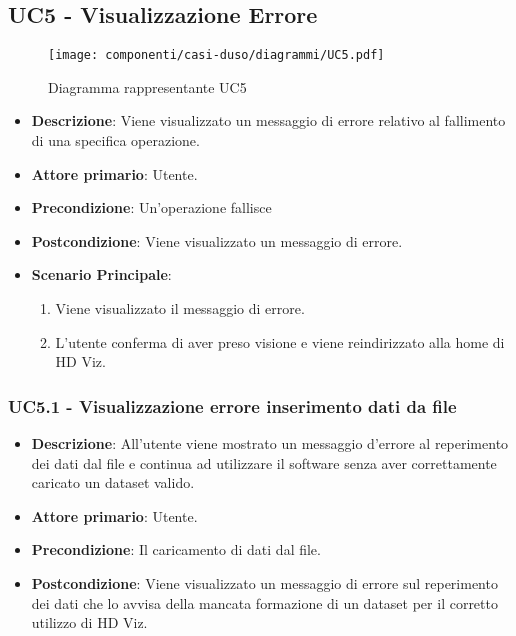 \newpage
\subsection{UC5 - Visualizzazione Errore}
\label{sub:uc5}

\begin{figure}[h]
    \centering
    \texttt{[image: componenti/casi-duso/diagrammi/UC5.pdf]}
    \caption{Diagramma rappresentante UC5}
    \label{fig:UC5}
\end{figure}

\begin{itemize}
    \item \textbf{Descrizione}: Viene visualizzato un messaggio di errore relativo al fallimento di una specifica operazione.

    \item \textbf{Attore primario}: Utente.
    
    \item \textbf{Precondizione}:   Un'operazione fallisce

    \item \textbf{Postcondizione}:  Viene visualizzato un messaggio di errore.
    
    \item \textbf{Scenario Principale}:
    \begin{enumerate}
        \item Viene visualizzato il messaggio di errore.
        \item L'utente conferma di aver preso visione e viene reindirizzato alla home di HD Viz.
    \end{enumerate}

\end{itemize}


\subsubsection{UC5.1 - Visualizzazione errore inserimento dati da file}
\label{ssub:uc5.1}
\begin{itemize}
    \item \textbf{Descrizione}: All'utente viene mostrato un messaggio d'errore al reperimento
                                dei dati dal file e continua ad utilizzare 
                                il software senza aver correttamente caricato un dataset valido.

    \item \textbf{Attore primario}: Utente.
    
    \item \textbf{Precondizione}:   Il caricamento di dati dal file.

    \item \textbf{Postcondizione}:  Viene visualizzato un messaggio di errore sul reperimento dei 
                                    dati che lo avvisa della mancata formazione di un dataset per il
                                    corretto utilizzo di HD Viz.

\end{itemize}


